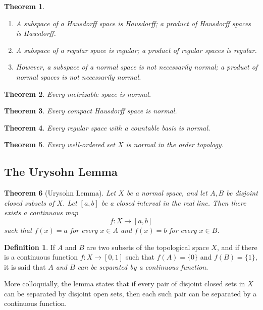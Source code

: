 \documentclass{article}
\newtheorem{theorem}{Theorem}[section]
\theoremstyle{remark}
\theoremstyle{definition}
\newtheorem{definition}{Definition}[section]
\begin{document}
\begin{theorem}
\begin{enumerate}
    \item A subspace of a Hausdorff space is Hausdorff; a product of Hausdorff spaces is Hausdorff. 
    \item A subspace of a regular space is regular; a product of regular spaces is regular. 
    \item However, a subspace of a normal space is not necessarily normal; a product of normal spaces is not necessarily normal. 
\end{enumerate}
\end{theorem}

\begin{theorem}
Every metrizable space is normal. 
\end{theorem}

\begin{theorem}
Every compact Hausdorff space is normal. 
\end{theorem}

\begin{theorem}
Every regular space with a countable basis is normal. 
\end{theorem}

\begin{theorem}
Every well-ordered set $X$ is normal in the order topology. 
\end{theorem}

\subsection{The Urysohn Lemma}
\begin{theorem}[Urysohn Lemma]
Let $X$ be a normal space, and let $A, B$ be disjoint closed subsets of $X$. Let $[a,b]$ be a closed interval in the real line. Then there exists a continuous map
\[f: X \longrightarrow [a,b]\]
such that $f(x) = a$ for every $x \in A$ and $f(x) = b$ for every $x \in B$. 
\end{theorem}


\begin{definition}
If $A$ and $B$ are two subsets of the topological space $X$, and if there is a continuous function $f: X \longrightarrow [0,1]$ such that $f(A) = \{0\}$ and $f(B) = \{1\}$, it is said that \textit{$A$ and $B$ can be separated by a continuous function}. 
\end{definition}

More colloquially, the lemma states that if every pair of disjoint closed sets in $X$ can be separated by disjoint open sets, then each such pair can be separated by a continuous function. 
\end{document}
